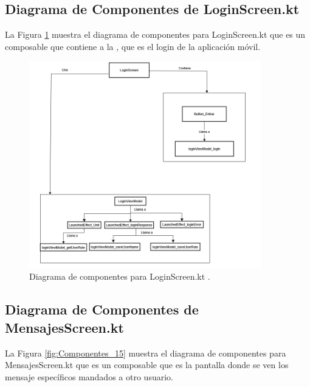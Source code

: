\newpage

\subsection{Diagrama de Componentes de LoginScreen.kt}

La Figura \ref{fig:Componentes_14} muestra el diagrama de componentes para LoginScreen.kt que es un composable que contiene a la , que es el login de la aplicación móvil.

\begin{figure}[htbp!]
	\begin{center}
		\includegraphics[width=0.9\textwidth]{DiagramasMoviles/DCM (27)}
		\caption{Diagrama de componentes para LoginScreen.kt .}
		\label{fig:Componentes_14}
	\end{center}
\end{figure}

\newpage

\subsection{Diagrama de Componentes de MensajesScreen.kt}

La Figura \ref{fig:Componentes_15} muestra el diagrama de componentes para MensajesScreen.kt que es un composable que es la pantalla donde se ven los mensaje específicos mandados a otro usuario.

